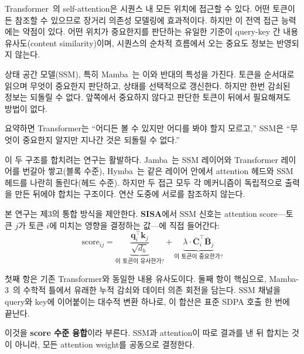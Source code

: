 \documentclass[11pt]{article}
\begin{document}
Transformer~\citep{vaswani2017attention}의 self-attention은 시퀀스 내 모든 위치에 접근할 수 있다. 어떤 토큰이든 참조할 수 있으므로 장거리 의존성 모델링에 효과적이다. 하지만 이 전역 접근 능력에는 약점이 있다. 어떤 위치가 중요한지를 판단하는 유일한 기준이 query-key 간 내용 유사도(content similarity)이며, 시퀀스의 순차적 흐름에서 오는 중요도 정보는 반영되지 않는다.

상태 공간 모델(SSM), 특히 Mamba~\citep{gu2023mamba, dao2024mamba2, mamba3}는 이와 반대의 특성을 가진다. 토큰을 순서대로 읽으며 무엇이 중요한지 판단하고, 상태를 선택적으로 갱신한다. 하지만 한번 감쇠된 정보는 되돌릴 수 없다. 앞쪽에서 중요하지 않다고 판단한 토큰이 뒤에서 필요해져도 방법이 없다.

요약하면 Transformer는 ``어디든 볼 수 있지만 어디를 봐야 할지 모르고,'' SSM은 ``무엇이 중요한지 알지만 지나간 것은 되돌릴 수 없다.''

이 두 구조를 합치려는 연구는 활발하다. Jamba~\citep{jamba}는 SSM 레이어와 Transformer 레이어를 번갈아 쌓고(블록 수준), Hymba~\citep{hymba}는 같은 레이어 안에서 attention 헤드와 SSM 헤드를 나란히 돌린다(헤드 수준). 하지만 두 접근 모두 각 메커니즘이 독립적으로 출력을 만든 뒤에야 합치는 구조이다. 연산 도중에 서로를 참조하지 않는다.

본 연구는 제3의 통합 방식을 제안한다. \textbf{SISA}에서 SSM 신호는 attention score---토큰 $j$가 토큰 $i$에 미치는 영향을 결정하는 값---에 직접 들어간다:
\begin{equation}
\text{score}_{ij} = \underbrace{\frac{\mathbf{q}_i^\top \mathbf{k}_j}{\sqrt{d_h}}}_{\text{이 토큰이 유사한가?}} + \underbrace{\lambda \cdot \bar{\mathbf{C}}_i^\top \bar{\mathbf{B}}_j}_{\text{이 토큰이 중요한가?}}
\end{equation}

첫째 항은 기존 Transformer와 동일한 내용 유사도이다. 둘째 항이 핵심으로, Mamba-3~\citep{mamba3}의 수학적 틀에서 유래한 누적 감쇠와 데이터 의존 회전을 담는다. SSM 채널을 query와 key에 이어붙이는 대수적 변환 하나로, 이 합산은 표준 SDPA 호출 한 번에 끝난다.

이것을 \textbf{score 수준 융합}이라 부른다. SSM과 attention이 따로 결과를 낸 뒤 합치는 것이 아니라, 모든 attention weight를 공동으로 결정한다.
\end{document}
